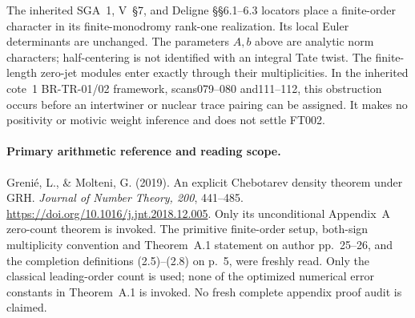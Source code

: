 The inherited SGA~1, V~\S7, and Deligne
\S\S6.1--6.3 locators place a finite-order character
in its finite-monodromy rank-one realization.
Its local Euler determinants are unchanged.
The parameters \(A,b\) above are analytic norm
characters; half-centering is not identified with an
integral Tate twist.
The finite-length zero-jet modules enter exactly
through their multiplicities.
In the inherited cote~1 BR-TR-01/02 framework,
scans079--080 and111--112, this obstruction occurs
before an intertwiner or nuclear trace pairing can
be assigned.  It makes no positivity or motivic
weight inference and does not settle FT002.

\paragraph{Primary arithmetic reference and reading scope.}
Greni\'e, L., \& Molteni, G. (2019).
An explicit Chebotarev density theorem under GRH.
\emph{Journal of Number Theory, 200}, 441--485.
\url{https://doi.org/10.1016/j.jnt.2018.12.005}.
Only its unconditional Appendix~A zero-count theorem
is invoked.  The primitive finite-order setup,
both-sign multiplicity convention and Theorem~A.1
statement on author pp.~25--26, and the completion
definitions (2.5)--(2.8) on p.~5, were freshly read.
Only the classical leading-order count is used;
none of the optimized numerical error constants
in Theorem~A.1 is invoked.
No fresh complete appendix proof audit is claimed.
